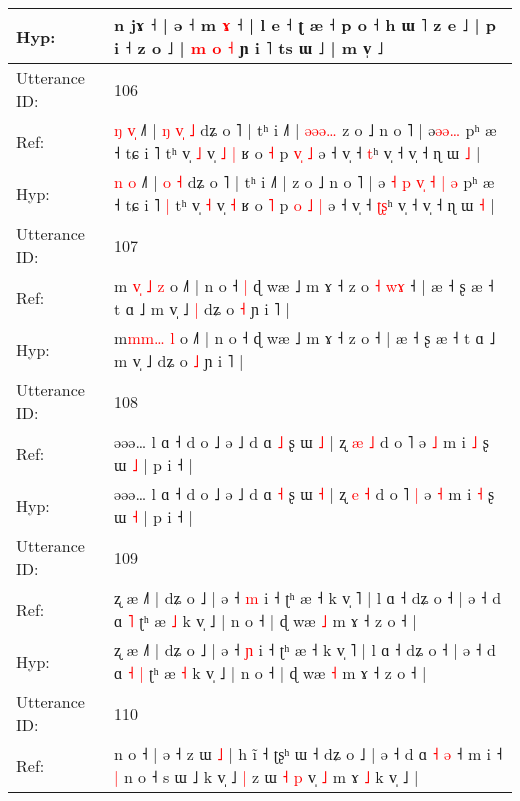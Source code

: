 \documentclass[10pt]{article}
\DeclareRobustCommand{\hl}[1]{{\textcolor{red}{#1}}}
\begin{document}
\begin{longtable}{ll}
Hyp: & n jɤ ˧ | ə ˧ m \hl{ɤ} ˧ | l e ˧ ʈ\hl{} æ ˧ p o ˧ h ɯ ˥ z e ˩ | p i ˧ z o ˩ | \hl{m} \hl{}\hl{o} \hl{˧} ɲ i ˥ ts ɯ ˩ | m v̩ ˩
 \\
\midrule
Utterance ID: & 106 \\
Ref: & \hl{ŋ} \hl{v}\hl{̩} ˩˥ |\hl{ }\hl{ŋ} \hl{v}\hl{̩} \hl{˩} dʑ o ˥ | tʰ i ˩˥ |\hl{ }\hl{ə}\hl{ə}\hl{ə}\hl{…} z o ˩ n o ˥ | ə\hl{}\hl{}\hl{}\hl{}\hl{}\hl{}\hl{}\hl{}\hl{}\hl{}\hl{ə}\hl{ə}\hl{…} pʰ æ ˧ tɕ i ˥\hl{}\hl{} tʰ v̩ \hl{˩} v̩\hl{ }\hl{˩} \hl{|} ʁ o \hl{˧} p \hl{}\hl{v}\hl{̩} \hl{˩} ə ˧ v̩ ˧ \hl{}\hl{t}ʰ v̩ ˧ v̩ ˧ ɳ ɯ \hl{˩} |
 \\
Hyp: & \hl{n} \hl{}\hl{o} ˩˥ |\hl{}\hl{} \hl{}\hl{o} \hl{˧} dʑ o ˥ | tʰ i ˩˥ |\hl{}\hl{}\hl{}\hl{}\hl{} z o ˩ n o ˥ | ə\hl{ }\hl{˧}\hl{ }\hl{p}\hl{ }\hl{v}\hl{̩}\hl{ }\hl{˧}\hl{ }\hl{|}\hl{ }\hl{ə} pʰ æ ˧ tɕ i ˥\hl{ }\hl{|} tʰ v̩ \hl{˧} v̩\hl{}\hl{} \hl{˧} ʁ o \hl{˥} p \hl{o}\hl{ }\hl{˩} \hl{|} ə ˧ v̩ ˧ \hl{ʈ}\hl{ʂ}ʰ v̩ ˧ v̩ ˧ ɳ ɯ \hl{˧} |
 \\
\midrule
Utterance ID: & 107 \\
Ref: & m\hl{ }\hl{v}\hl{̩}\hl{ }\hl{˩} \hl{z} o ˩˥ | n o ˧\hl{ }\hl{|} ɖ wæ ˩ m ɤ ˧ z o\hl{ }\hl{˧}\hl{ }\hl{w}\hl{ɤ} ˧ | æ ˧ ʂ æ ˧ t ɑ ˩ m v̩ ˩\hl{ }\hl{|} dʑ o \hl{˧} ɲ i ˥ |
 \\
Hyp: & m\hl{}\hl{}\hl{m}\hl{m}\hl{…} \hl{l} o ˩˥ | n o ˧\hl{}\hl{} ɖ wæ ˩ m ɤ ˧ z o\hl{}\hl{}\hl{}\hl{}\hl{} ˧ | æ ˧ ʂ æ ˧ t ɑ ˩ m v̩ ˩\hl{}\hl{} dʑ o \hl{˩} ɲ i ˥ |
 \\
\midrule
Utterance ID: & 108 \\
Ref: & əəə… l ɑ ˧ d o ˩ ə ˩ d ɑ \hl{˩} ʂ ɯ \hl{˩} | ʐ \hl{æ} \hl{˩} d o ˥\hl{}\hl{} ə \hl{˩} m i \hl{˩} ʂ ɯ \hl{˩} | p i ˧ |
 \\
Hyp: & əəə… l ɑ ˧ d o ˩ ə ˩ d ɑ \hl{˧} ʂ ɯ \hl{˧} | ʐ \hl{e} \hl{˧} d o ˥\hl{ }\hl{|} ə \hl{˧} m i \hl{˧} ʂ ɯ \hl{˧} | p i ˧ |
 \\
\midrule
Utterance ID: & 109 \\
Ref: & ʐ æ ˩˥ | dʑ o ˩ | ə ˧ \hl{m} i ˧ ʈʰ æ ˧ k v̩ ˥ | l ɑ ˧ dʑ o ˧ | ə ˧ d ɑ\hl{}\hl{} \hl{˥} ʈʰ æ \hl{˩} k v̩ ˩ | n o ˧ | ɖ wæ \hl{˩} m ɤ ˧ z o ˧ |
 \\
Hyp: & ʐ æ ˩˥ | dʑ o ˩ | ə ˧ \hl{ɲ} i ˧ ʈʰ æ ˧ k v̩ ˥ | l ɑ ˧ dʑ o ˧ | ə ˧ d ɑ\hl{ }\hl{˧} \hl{|} ʈʰ æ \hl{˧} k v̩ ˩ | n o ˧ | ɖ wæ \hl{˧} m ɤ ˧ z o ˧ |
 \\
\midrule
Utterance ID: & 110 \\
Ref: & n o ˧ | ə ˧ \hl{}z ɯ \hl{˩} | h ĩ ˧ ʈʂʰ ɯ ˧ dʑ o ˩ | ə ˧ d ɑ\hl{ }\hl{˧}\hl{ }\hl{ə} ˧ m i ˧\hl{ }\hl{|} n o ˧ s ɯ ˩ k v̩ ˩\hl{ }\hl{|} z ɯ \hl{˧} \hl{p} v̩ \hl{˩} m ɤ \hl{˩} k v̩ ˩ |

\end{longtable}
\end{document}
